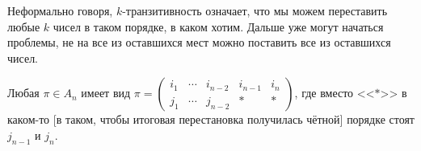 \documentclass[a4paper]{report}
\begin{document}
    Неформально говоря, $k$-транзитивность означает, что мы можем переставить любые $k$ чисел в таком порядке, в каком хотим.
    Дальше уже могут начаться проблемы, не на все из оставшихся мест можно поставить все из оставшихся чисел.


    Любая $\pi \in A_n$ имеет вид $\pi = \left(\begin{array}{ccccc}
                                                   i_1 & \cdots & i_{n-2} & i_{n-1} & i_n \\
                                                   j_1 & \cdots & j_{n-2} & *       & *
    \end{array}\right)$, где вместо <<$*$>> в каком-то [в таком, чтобы итоговая перестановка получилась чётной] порядке стоят $j_{n-1}$ и $j_{n}$.
\end{document}
